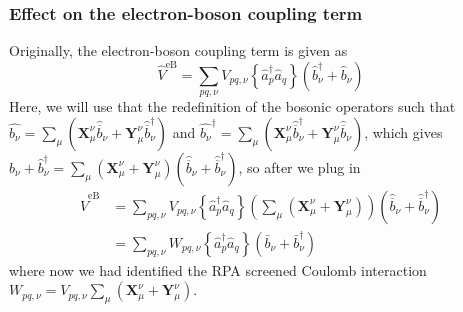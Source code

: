 \subsubsection{Effect on the electron-boson coupling term}
Originally, the electron-boson coupling term is given as
\begin{equation}
\hat{V}^{\mathrm{eB}}=\sum_{p q, \nu} V_{p q, \nu}\left\{\hat{a}_p^{\dagger} \hat{a}_q\right\}\left(\hat{b}_\nu^{\dagger}+\hat{b}_\nu\right)
\end{equation}
Here, we will use that the redefinition of the bosonic operators such that $\hat{b_\nu} = \sum_\mu \left(\mathbf{X}_{\mu}^{\nu} \hat{\overline{b}}_\nu + \mathbf{Y}_{\mu}^{\nu} \hat{\overline{b}}_\nu^{\dagger}\right)$ and $\hat{b_\nu}^\dagger = \sum_\mu \left(\mathbf{X}_{\mu}^{\nu} \hat{\overline{b}}_\nu^\dagger + \mathbf{Y}_{\mu}^{\nu} \hat{\overline{b}}_\nu\right)$, which gives $\hat{b}_\nu + \hat{b}_{\nu}^\dagger = \sum_\mu \left(\mathbf{X}_{\mu}^{\nu} + \mathbf{Y}_{\mu}^{\nu}\right) \left(\hat{\overline{b}}_\nu + \hat{\overline{b}}_\nu^\dagger\right)$, so after we plug in
\begin{align}
\hat{V}^{\mathrm{eB}}&=\sum_{p q, \nu} V_{p q, \nu}\left\{\hat{a}_p^{\dagger} \hat{a}_q\right\}\left(\sum_\mu \left(\mathbf{X}_{\mu}^{\nu}  + \mathbf{Y}_{\mu}^{\nu} \right) \right)\left(\hat{\overline{b}}_\nu + \hat{\overline{b}}_\nu^\dagger\right) \\
&= \sum_{p q, \nu} W_{p q, \nu} \left\{ \hat{a}_p^{\dagger} \hat{a}_q \right\}\left(\bar{b}_\nu+\bar{b}_\nu^{\dagger}\right)
\end{align}
where now we had identified the RPA screened Coulomb interaction $W_{p q, \nu} = V_{p q, \nu} \sum_\mu\left(\mathbf{X}_{\mu}^{\nu} + \mathbf{Y}_{\mu}^{\nu}\right)$. 
